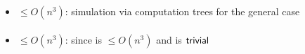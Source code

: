 \paragraph{\OMODLA{}\tto\TDFA}\label{cost:OM1DLAto2DFAu}
\begin{itemize}
	\item $\le O(n^3)$: simulation via computation trees for the general case \cite{PigPri23a}
\end{itemize}
\paragraph{\OMODLA{}\tto\TNFA}
\begin{itemize}
	\item $\le O(n^3)$: since \hyperref[cost:OM1DLAto2DFAu]{\OMODLA{}\tto\TDFA} is $\le O(n^3)$ and \TDFA{}\tto\TNFA is $\mathsf{trivial}$
\end{itemize}
